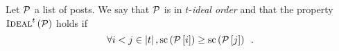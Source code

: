 \begin{definition}
  Let $\mathcal{P}$ a list of posts. We say that $\mathcal{P}$ is in
  $t$-\emph{ideal order} and that the property
  $\textsc{Ideal}^{t}\left(\mathcal{P}\right)$ holds if
  \begin{equation*}
    \forall i < j \in \left|t\right|,
    \mathrm{sc}\left(\mathcal{P}\left[i\right]\right) \geq
    \mathrm{sc}\left(\mathcal{P}\left[j\right]\right) \enspace.
  \end{equation*}
\end{definition}
